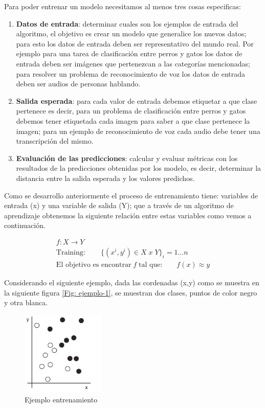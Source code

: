 Para poder entrenar un modelo necesitamos al menos tres cosas especificas:
\begin{enumerate}
\item \textbf{Datos de entrada}: determinar cuales son los ejemplos de entrada del algoritmo, el objetivo es crear un modelo que generalice los nuevos datos; para esto los datos de entrada deben ser representativo del mundo real. Por ejemplo para una tarea de clasificación entre perros y gatos los datos de entrada deben ser imágenes que pertenezcan a las categorías mencionadas; para resolver un problema de reconocimiento de voz los datos de entrada deben ser audios de personas hablando.

\item \textbf{Salida esperada}: para cada valor de entrada debemos etiquetar a que clase pertenece es decir, para un problema de clasificación entre perros y gatos debemos tener etiquetada cada imagen para saber a que clase pertenece la imagen; para un ejemplo de reconocimiento de voz cada audio debe tener una transcripción del mismo.

\item \textbf{Evaluación de las predicciones}: calcular y evaluar métricas con los resultados de la predicciones obtenidas por los modelo, es decir, determinar la distancia entre la salida esperada y los valores predichos.
\end{enumerate}

Como se desarrollo anteriormente el proceso de entrenamiento tiene: variables de entrada (x) y una variable de salida (Y); que a través de un algoritmo de aprendizaje obtenemos la siguiente relación entre estas variables como vemos a continuación.


\begin{eqnarray}
 f:X \longrightarrow Y\\
 \mbox{Training}:\qquad \{(x^i, y^i) \in X\; x\; Y \} _i=1...n\\
 \mbox{El objetivo es encontrar}\; f\; \mbox{tal que:}\qquad f(x)\approx y
\end{eqnarray}

Considerando el siguiente ejemplo, dada las cordenadas (x,y) como se muestra en la siguiente figura \ref{Fig: ejemplo-1}, se muestran dos clases, puntos de color negro y otra blanca.
\begin{figure}[H] \centering
  \includegraphics[height=4cm,keepaspectratio=true,clip=true]{imagenes/MarcoTeorico/sample.png}
  \caption{Ejemplo entrenamiento}\label{Fig:ejemplo-1}
\end{figure}


